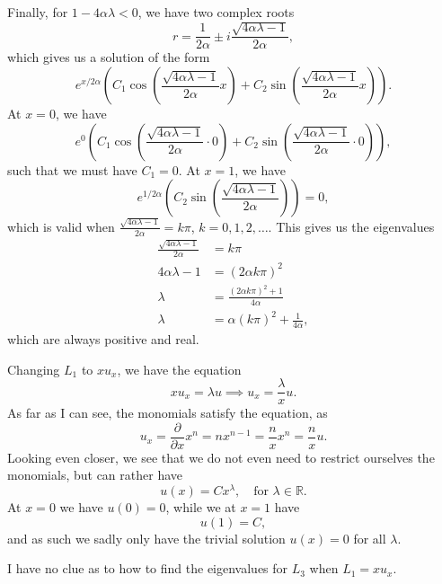 \begin{solution}{4.6}
    Finally, for $1 - 4 \alpha \lambda < 0$, we have two complex roots
    \begin{equation}
        r = \frac{1}{2\alpha} \pm i \frac{\sqrt{4 \alpha \lambda - 1}}{2\alpha},
    \end{equation}
    which gives us a solution of the form
    \begin{equation}
        e^{x / 2\alpha} \left(
            C_1 \cos\left(\frac{\sqrt{4 \alpha \lambda - 1}}{2\alpha} x\right)
            + C_2 \sin\left(\frac{\sqrt{4 \alpha \lambda - 1}}{2\alpha} x\right)
        \right).
    \end{equation}
    At $x = 0$, we have
    \begin{equation}
        e^{0} \left(
            C_1 \cos\left(\frac{\sqrt{4 \alpha \lambda - 1}}{2\alpha} \cdot 0 \right)
            + C_2 \sin\left(\frac{\sqrt{4 \alpha \lambda - 1}}{2\alpha} \cdot 0 \right)
        \right),
    \end{equation}
    such that we must have $C_1 = 0$.
    At $x = 1$, we have
    \begin{equation}
        e^{1 / 2\alpha} \left( C_2 \sin\left(\frac{\sqrt{4 \alpha \lambda - 1}}{2\alpha}\right) \right) = 0,
    \end{equation}
    which is valid when $\frac{\sqrt{4 \alpha \lambda - 1}}{2\alpha} = k \pi$, $k = 0, 1, 2, \ldots$.
    This gives us the eigenvalues
    \begin{align*}
        \frac{\sqrt{4 \alpha \lambda - 1}}{2\alpha} &= k \pi \\
        4 \alpha \lambda - 1 &= (2\alpha k \pi)^2 \\
        \lambda &= \frac{(2 \alpha k \pi)^2 + 1}{4 \alpha} \\
        \lambda &= \alpha (k \pi)^2 + \frac{1}{4 \alpha},
    \end{align*}
    which are always positive and real.

    Changing $L_1$ to $x u_x$, we have the equation
    \begin{equation}
        x u_x = \lambda u \implies u_x = \frac{\lambda}{x} u.
    \end{equation}
    As far as I can see, the monomials satisfy the equation, as
    \begin{equation}
        u_x = \frac{\partial}{\partial x} x^n = n x^{n - 1} = \frac{n}{x} x^n = \frac{n}{x} u.
    \end{equation}
    Looking even closer, we see that we do not even need to restrict ourselves the monomials, but can rather have
    \begin{equation}
        u(x) = C x^\lambda,
        \quad \text{for }
        \lambda \in \mathbb{R}.
    \end{equation}
    At $x = 0$ we have $u(0) = 0$, while we at $x = 1$ have
    \begin{equation}
        u(1) = C,
    \end{equation}
    and as such we sadly only have the trivial solution $u(x) = 0$ for all $\lambda$.

    I have no clue as to how to find the eigenvalues for $L_3$ when $L_1 = x u_x$.
\end{solution}